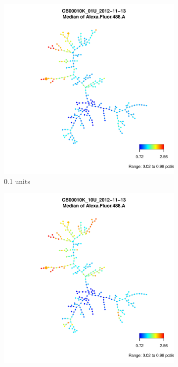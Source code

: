 \begin{figure}[h]
\begin{subfigure}[b]{.4\textwidth}
  \includegraphics[scale=.4]{IL2/figures/CB00010K-01U-2012-11-13-spade.pdf}
  \caption{0.1 units}
\end{subfigure}
\begin{subfigure}[b]{.4\textwidth}
  \includegraphics[scale=.4]{IL2/figures/CB00010K-10U-2012-11-13-spade.pdf}

\end{subfigure}
\end{figure}
